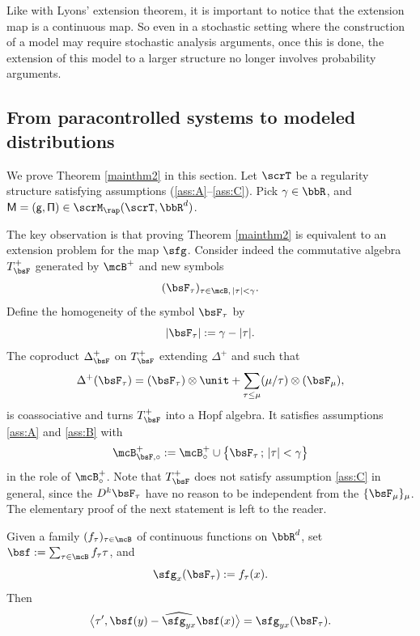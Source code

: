 Like with Lyons' extension theorem, it is important to notice that the extension map is a continuous map. So even in a stochastic setting where the construction of a model may require stochastic analysis arguments, once this is done, the extension of this model to a larger structure no longer involves probability arguments.

\subsection{From paracontrolled systems to modeled distributions}
\label{SubsectionPCtoModelledDistributions}

We prove Theorem \ref{mainthm2} in this section. Let $\scrT$ be a regularity structure satisfying assumptions (\ref{ass:A}--\ref{ass:C}). Pick $\gamma\in\bbR$, and ${\sf M = (g, \Pi)}\in\scrM_\rap(\scrT,\bbR^d)$.

The key observation is that proving Theorem \ref{mainthm2} is equivalent to an extension problem for the map $\sfg$. Consider indeed the commutative algebra $T_{\bsF}^+$ generated by $\mcB^+$ and new symbols
\begin{align*}
(\bsF_\tau)_{\tau\in\mcB,\, |\tau|<\gamma}.
\end{align*}
Define the homogeneity of the symbol $\bsF_\tau$ by
\[
|\bsF_\tau| := \gamma - |\tau|.
\]
The coproduct $\Delta^+_{\bsF}$ on $T_{\bsF}^+$ extending $\Delta^+$ and such that
\begin{align}\label{eq:def of Delta F/tau}
\Delta^+(\bsF_\tau) = (\bsF_\tau)\otimes\unit+\sum_{\tau\le\mu}(\mu/\tau)\otimes(\bsF_\mu),
\end{align}
is coassociative and turns $T^+_{\bsF}$ into a Hopf algebra. It satisfies assumptions \eqref{ass:A} and \eqref{ass:B} with
\[
\mcB^+_{{\bsF},\circ} := \mcB^+_\circ\cup\big\{{\bsF}_\tau\,;\,\vert\tau\vert<\gamma\big\}
\]
in the role of $\mcB^+_\circ$.
Note that $T_{\bsF}^+$ does not satisfy assumption \eqref{ass:C} in general, since the $D^k\bsF_\tau$ have no reason to be independent from the $\{\bsF_\mu\}_\mu$. The elementary proof of the next statement is left to the reader.

\begin{lem}\label{lem: model on Ftau is equiv to MD}
Given a family $(f_\tau)_{\tau\in\mcB}$ of continuous functions on $\bbR^d$, set $\bsf := \sum_{\tau\in\mcB}f_\tau\tau$, and
\[
\sfg_x(\bsF_\tau) := f_\tau(x) .
\]
Then
\[
\big\langle \tau', \bsf(y) - \widehat{\sfg_{yx}}\bsf(x)\big\rangle = \sfg_{yx}(\bsF_\tau).
\]
\end{lem}

